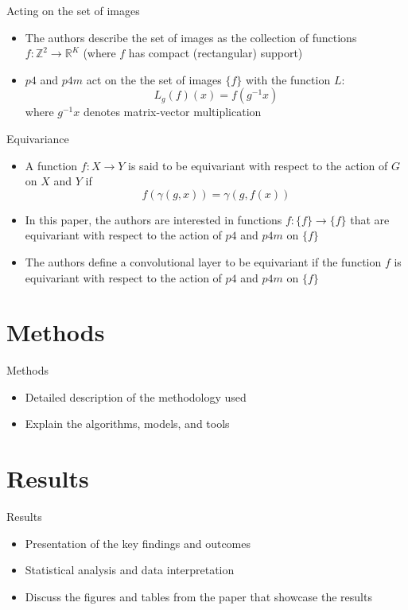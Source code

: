 \documentclass{beamer}
\newcommand{\R}{\mathbb{R}}
\newcommand{\Z}{\mathbb{Z}}
\begin{document}
\begin{frame}{Acting on the set of images}
    \begin{itemize}
        \item The authors describe the set of images as the collection of functions $f: \Z^2 \to \R^K$ (where $f$ has compact (rectangular) support)
        \item $p4$ and $p4m$ act on the the set of images $\{f\}$ with the function $L$:
        $$L_g(f)(x) = f(g^{-1}x)$$
        where $g^{-1}x$ denotes matrix-vector multiplication
    \end{itemize}
\end{frame}

\begin{frame}{Equivariance}
    \begin{itemize}
        \item A function $f: X \to Y$ is said to be equivariant with respect to the action of $G$ on $X$ and $Y$ if
        $$f(\gamma(g, x)) = \gamma(g, f(x))$$
        \item In this paper, the authors are interested in functions $f: \{f\} \to \{f\}$ that are equivariant with respect to the action of $p4$ and $p4m$ on $\{f\}$
        \item The authors define a convolutional layer to be equivariant if the function $f$ is equivariant with respect to the action of $p4$ and $p4m$ on $\{f\}$
    \end{itemize}
\end{frame}
\section{Methods}
\begin{frame}{Methods}
    \begin{itemize}
        \item Detailed description of the methodology used
        \item Explain the algorithms, models, and tools
    \end{itemize}
\end{frame}

\section{Results}
\begin{frame}{Results}
    \begin{itemize}
        \item Presentation of the key findings and outcomes
        \item Statistical analysis and data interpretation
        \item Discuss the figures and tables from the paper that showcase the results
    \end{itemize}
\end{frame}
\end{document}

